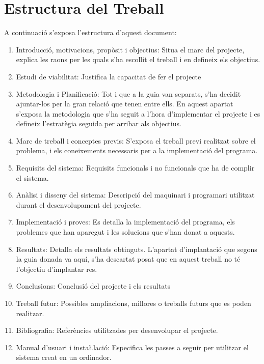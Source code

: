 \documentclass[11pt,a4paper,twoside]{report}
\begin{document}
  \section{Estructura del Treball}
  A continuació s'exposa l'estructura d'aquest document: 
  \begin{enumerate}
    \item Introducció, motivacions, propòsit i objectius: Situa el marc del projecte, explica les raons per les quals s'ha escollit el treball i en defineix els objectius.
    \item Estudi de viabilitat: Justifica la capacitat de fer el projecte
    \item Metodologia i Planificació: Tot i que a la guia van separats, s'ha decidit ajuntar-los per la gran relació que tenen entre ells. En aquest apartat s'exposa la metodologia que s'ha seguit a l'hora d'implementar el projecte i es defineix l'estratègia seguida per arribar als objectius.
    \item Marc de treball i conceptes previs: S'exposa el treball previ realitzat sobre el problema, i els coneixements necessaris per a la implementació del programa.
    \item Requisits del sistema: Requisits funcionals i no funcionals que ha de complir el sistema.
    \item Anàlisi i disseny del sistema: Descripció del maquinari i programari utilitzat durant el desenvolupament del projecte.
    \item Implementació i proves: Es detalla la implementació del programa, els problemes que han aparegut i les solucions que s'han donat a aquests.
    \item Resultats: Detalla els resultats obtinguts. L'apartat d'implantació que segons la guia donada va aquí, s'ha descartat posat que en aquest treball no té l'objectiu d'implantar res.
    \item Conclusions: Conclusió del projecte i els resultats
    \item Treball futur: Possibles ampliacions, millores o treballs futurs que es poden realitzar.
    \item Bibliografia: Referències utilitzades per desenvolupar el projecte.
    \item Manual d'usuari i insta\l.lació: Especifica les passes a seguir per utilitzar el sistema creat en un ordinador.

  \end{enumerate}
\end{document}
